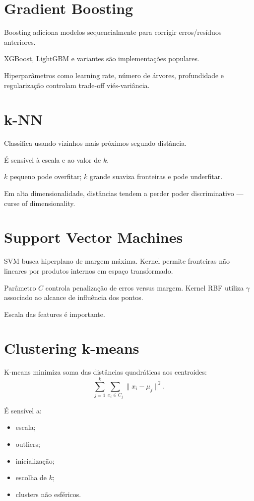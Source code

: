 \section{Gradient Boosting}

Boosting adiciona modelos sequencialmente para corrigir erros/resíduos anteriores.

XGBoost, LightGBM e variantes são implementações populares.

Hiperparâmetros como learning rate, número de árvores, profundidade e regularização controlam trade-off viés-variância.

\section{k-NN}

Classifica usando vizinhos mais próximos segundo distância.

É sensível à escala e ao valor de $k$.

$k$ pequeno pode overfitar; $k$ grande suaviza fronteiras e pode underfitar.

Em alta dimensionalidade, distâncias tendem a perder poder discriminativo — curse of dimensionality.

\section{Support Vector Machines}

SVM busca hiperplano de margem máxima. Kernel permite fronteiras não lineares por produtos internos em espaço transformado.

Parâmetro $C$ controla penalização de erros versus margem. Kernel RBF utiliza $\gamma$ associado ao alcance de influência dos pontos.

Escala das features é importante.

\section{Clustering k-means}

K-means minimiza soma das distâncias quadráticas aos centroides:
\[
\sum_{j=1}^k\sum_{x_i\in C_j}\|x_i-\mu_j\|^2.
\]

É sensível a:
\begin{itemize}
\item escala;
\item outliers;
\item inicialização;
\item escolha de $k$;
\item clusters não esféricos.
\end{itemize}

